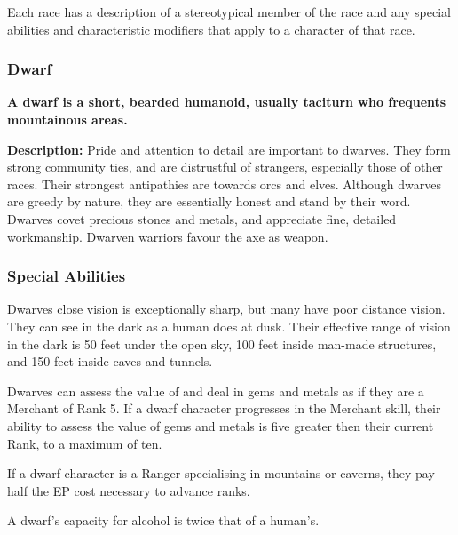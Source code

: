 \begin{multicols*}{3}
Each race has a description of a stereotypical member of the race and
any special abilities and characteristic modifiers that apply to a
character of that race.

\subsubsection{Dwarf}

\textbf{A dwarf is a short, bearded humanoid, usually taciturn who
frequents mountainous areas.}

\textbf{Description:} Pride and attention to detail are important to
dwarves. They form strong community ties, and are distrustful of
strangers, especially those of other races. Their strongest
antipathies are towards orcs and elves. Although dwarves are greedy by
nature, they are essentially honest and stand by their word.  Dwarves
covet precious stones and metals, and appreciate fine, detailed
workmanship. Dwarven warriors favour the axe as weapon.

\subsubsection{Special Abilities}

\begin{Enumerate}
\item
Dwarves close vision is exceptionally sharp, but many have poor
distance vision. They can see in the dark as a human does at
dusk. Their effective range of vision in the dark is 50 feet under the
open sky, 100 feet inside man-made structures, and 150 feet inside
caves and tunnels.

\item
Dwarves can assess the value of and deal in gems and metals as if they
are a Merchant of Rank 5. If a dwarf character progresses in the
Merchant skill, their ability to assess the value of gems and metals
is five greater then their current Rank, to a maximum of ten.

\item
If a dwarf character is a Ranger specialising in mountains or caverns,
they pay half the EP cost necessary to advance ranks.

\item
A dwarf's capacity for alcohol is twice that of a human's.
\end{Enumerate}


\end{multicols*}
